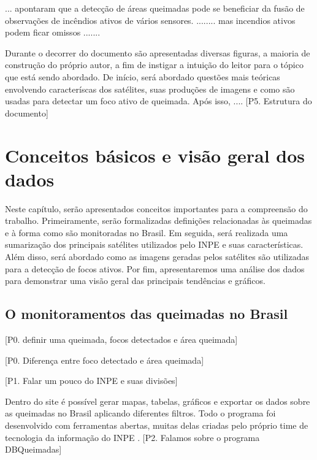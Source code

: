 \documentclass[cic,tc]{iiufrgs}
\begin{document}
... apontaram que a detecção de áreas queimadas pode se beneficiar da fusão de observações de incêndios ativos de vários sensores. \citep{giglio2010assessing} ........ mas incendios ativos podem ficar omissos \citep{giglio2009active} ....... \par

Durante o decorrer do documento são apresentadas diversas figuras, a maioria de construção do próprio autor, a fim de instigar a intuição do leitor para o tópico que está sendo abordado. De início, será abordado questões mais teóricas envolvendo caracteríscas dos satélites, suas produções de imagens e como são usadas para detectar um foco ativo de queimada. Após isso, .... [P5. Estrutura do documento] \par



\chapter{Conceitos básicos e visão geral dos dados}

Neste capítulo, serão apresentados conceitos importantes para a compreensão do trabalho. Primeiramente, serão formalizadas definições relacionadas às queimadas e à forma como são monitoradas no Brasil. Em seguida, será realizada uma sumarização dos principais satélites utilizados pelo INPE e suas características. Além disso, será abordado como as imagens geradas pelos satélites são utilizadas para a detecção de focos ativos. Por fim, apresentaremos uma análise dos dados para demonstrar uma visão geral das principais tendências e gráficos. \par

\section{O monitoramentos das queimadas no Brasil}

[P0. definir uma queimada, focos detectados e área queimada] \par

[P0. Diferença entre foco detectado e área queimada] \par

[P1. Falar um pouco do INPE e suas divisões] \par

Dentro do site é possível gerar mapas, tabelas, gráficos e exportar os dados sobre as queimadas no Brasil aplicando diferentes filtros. Todo o programa foi desenvolvido com ferramentas abertas, muitas delas criadas pelo próprio time de tecnologia da informação do INPE \citep{setzer2019banco}. [P2. Falamos sobre o programa DBQueimadas] \par
\end{document}
